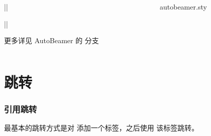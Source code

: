 \begin{shadedsection}
\begin{frame}[fragile]
\begin{columns}
\begin{column}{0.5\textwidth}
\begin{codeblock}[]{}
    \begin{frame}[allowframebreaks=0.8,fragile]
||    \end{frame}
||
      \end{codeblock}
      \begin{alertblock}{}
        更多详见 AutoBeamer 的 \faCodeBranch{}  分支 
      \end{alertblock}
    \end{column}
    \begin{column}{0.5\textwidth}
      \begin{codeblock}[]{autobeamer.sty}
\def\section#1{\par\framebreak
  {\bfseries \color{red} #1}}
\def\chapter#1{\framebreak
  \vspace*{0.3\paperheight}
  \begin{center}
    \Large\color{red} #1 
  \end{center}
  \vspace*{0.3\paperheight}
  \newpage}
      \end{codeblock}
    \end{column}
  \end{columns}
\end{frame}

\section{跳转}

\begin{frame}[fragile,label=jump]
  \frametitle{引用跳转}
  最基本的跳转方式是对  添加一个标签，之后使用  该标签跳转。
  
  \begin{columns}
    \begin{column}{0.5\textwidth}
\end{column}
\end{columns}
\end{frame}
\end{shadedsection}
